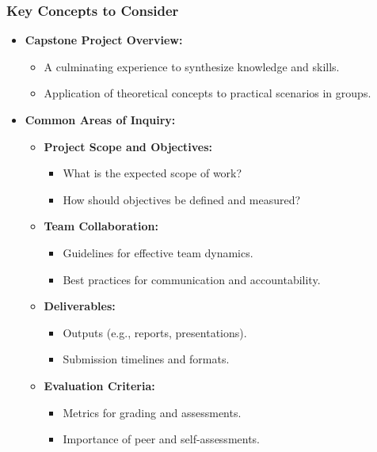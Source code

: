 \documentclass[aspectratio=169]{beamer}
\begin{document}
\begin{frame}[fragile]
    \frametitle{Key Concepts to Consider}
    \begin{itemize}
        \item \textbf{Capstone Project Overview:}
        \begin{itemize}
            \item A culminating experience to synthesize knowledge and skills.
            \item Application of theoretical concepts to practical scenarios in groups.
        \end{itemize}
        
        \item \textbf{Common Areas of Inquiry:}
        \begin{itemize}
            \item \textbf{Project Scope and Objectives:}
            \begin{itemize}
                \item What is the expected scope of work?
                \item How should objectives be defined and measured?
            \end{itemize}
            \item \textbf{Team Collaboration:}
            \begin{itemize}
                \item Guidelines for effective team dynamics.
                \item Best practices for communication and accountability.
            \end{itemize}
            \item \textbf{Deliverables:}
            \begin{itemize}
                \item Outputs (e.g., reports, presentations).
                \item Submission timelines and formats.
            \end{itemize}
            \item \textbf{Evaluation Criteria:}
            \begin{itemize}
                \item Metrics for grading and assessments.
                \item Importance of peer and self-assessments.
            \end{itemize}
        \end{itemize}
    \end{itemize}
\end{frame}
\end{document}
